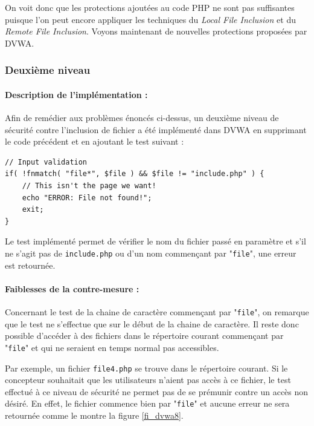On voit donc que les protections ajoutées au code PHP ne sont pas suffisantes puisque l'on peut encore appliquer les techniques du \textit{Local File Inclusion} et du \textit{Remote File Inclusion}. Voyons maintenant de nouvelles protections proposées par DVWA.

\subsubsection{Deuxième niveau}

\paragraph{Description de l'implémentation :}


Afin de remédier aux problèmes énoncés ci-dessus, un deuxième niveau de sécurité contre l'inclusion de fichier a été implémenté dans DVWA en supprimant le code précédent et en ajoutant le test  suivant :
\begin{lstlisting}
// Input validation
if( !fnmatch( "file*", $file ) && $file != "include.php" ) {
    // This isn't the page we want!
    echo "ERROR: File not found!";
    exit;
} 
\end{lstlisting}

Le test implémenté permet de vérifier le nom du fichier passé en paramètre et s'il ne s'agit pas de \texttt{include.php} ou d'un nom commençant par "\texttt{file}", une erreur est retournée.

\paragraph{Faiblesses de la contre-mesure :}

Concernant le test de la chaine de caractère commençant par "\texttt{file}", on remarque que le test ne s'effectue que sur le début de la chaine de caractère. Il reste donc possible d'accéder à des fichiers dans le répertoire courant commençant par "\texttt{file}" et qui ne seraient en temps normal pas accessibles. 

Par exemple, un fichier \texttt{file4.php} se trouve dans le répertoire courant. Si le concepteur souhaitait que les utilisateurs n'aient pas accès à ce fichier, le test effectué à ce niveau de sécurité ne permet pas de se prémunir contre un accès non désiré. En effet, le fichier commence bien par "\texttt{file}" et aucune erreur ne sera retournée comme le montre la figure \ref{fi_dvwa8}.


